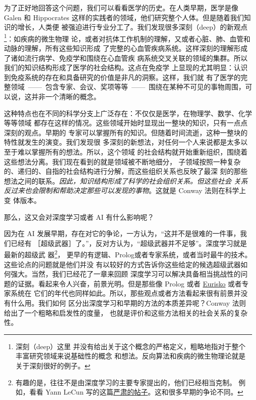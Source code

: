 为了正好地回答这个问题，我们可以看看医学的历史。在人类早期，医学是像 Galen 和
Hippocrates 这样的实践者的领域，他们研究整个人体。但是随着我们知识的增长，人类便
被强迫进行专业分工了。我们发现很多深刻（deep）的新观点\footnote{深刻（deep）这里
  并没有给出关于这个概念的严格定义，粗略地指对于整个丰富研究领域来说基础性的概念
  和想法。反向算法和疾病的微生物理论就是关于深刻很好的例子。}：如疾病的微生物理
论，或者对抗体工作机制的理解，又或者心脏、肺、血管和动脉的理解，所有这些知识形成
了完整的心血管疾病系统。这样深刻的理解形成了诸如流行病学、免疫学和围绕在心血管疾
病系统交叉关联的领域的集群。所以我们的知识结构形成了医学的社会结构。这点在免疫学
上显现的尤其明显：认识到免疫系统的存在和具备研究的价值是非凡的洞察。这样，我们就
有了医学的完整领域~——~包含专家、会议、奖项等等~——~围绕在某种不可见的事物周围，可
以说，这并非一个清晰的概念。

这种特点也在不同的科学分支上广泛存在：不仅仅是医学，在物理学、数学、化学等等领域
都存在这样的情况。这些领域开始时显现出一整块的知识，只有一点点深刻的观点。早期的
专家可以掌握所有的知识。但随着时间流逝，这种一整块的特性就发生的演变。我们发现很
多深刻的新想法，对任何一个人来说都是太多以至于难以掌握所有的想法。所以，这个领域
的社会结构就开始重新组织，围绕着这些想法分离。我们现在看到的就是领域被不断地细分，
子领域按照一种复杂的、递归的、自指的社会结构进行分解，而这些组织关系也反映了最深
刻的那些想法之间的联系。\emph{因此，知识结构形成了科学的社会组织关系。但这些社会
  关系反过来也会限制和帮助决定那些可以发现的事物}。这就是 Conway 法则在科学上变
体版本。

那么，这又会对深度学习或者 AI 有什么影响呢？

因为在 AI 发展早期，存在对它的争论，一方认为，“这并不是很难的一件事，我们已经有
［超级武器］了。”，反对方认为，“超级武器并不足够”。深度学习就是最新的超级武
器\footnote{有趣的是，往往不是由深度学习的主要专家提出的，他们已经相当克制。
例如，看看 Yann LeCun 写的这篇\href{https://www.facebook.com/yann.lecun/posts/10152348155137143}{严肃的帖子}。这和很多早期的争论不同。}，
更早的有逻辑、Prolog或者专家系统，或者当时最牛的技术。这些论点的问题就是他们并没
有以较好的方式告诉你这些给定的候选超级武器如何强大。当然，我们已经花了一章来回顾
深度学习可以解决具备相当挑战性的问题的证据。看起来令人兴奋，前景光明。但是那些像
Prolog 或者 \href{http://en.wikipedia.org/wiki/Eurisko}{Eurisko} 或者专家系统在
它们的年代也同样如此。所以，那些观点或者方法看起来很有前景并没有什么用。我们如何
区分出深度学习和早期的方法的本质差异呢？Conway 法则给出了一个粗略和启发性的度量，
也就是评价和这些方法相关的社会关系的复杂性。

